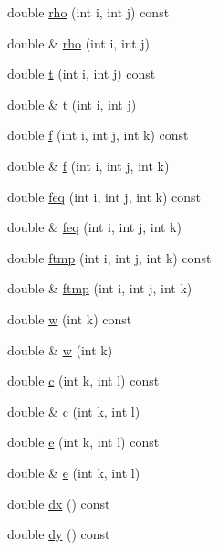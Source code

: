 \begin{DoxyCompactItemize}
double \mbox{\hyperlink{classStaggeredGrid_a5a5893e93d39443f13e13d05c139a8fc}{rho}} (int i, int j) const
\item 
double \& \mbox{\hyperlink{classStaggeredGrid_a73fd2714e8ce9af369c2dc3b3301369c}{rho}} (int i, int j)
\item 
double \mbox{\hyperlink{classStaggeredGrid_a477e8942e756cc2baecd1aaa5795bb3d}{t}} (int i, int j) const
\item 
double \& \mbox{\hyperlink{classStaggeredGrid_a30c69c5b8e2803a1e4d876f3942cecb1}{t}} (int i, int j)
\item 
double \mbox{\hyperlink{classStaggeredGrid_a2a9f3c3dc78482fc452920b5bbb2792e}{f}} (int i, int j, int k) const
\item 
double \& \mbox{\hyperlink{classStaggeredGrid_ad4ac0ad1aa8623609c4843c2ae10c37c}{f}} (int i, int j, int k)
\item 
double \mbox{\hyperlink{classStaggeredGrid_ac2473c046774f2e69a876187b574880a}{feq}} (int i, int j, int k) const
\item 
double \& \mbox{\hyperlink{classStaggeredGrid_ac0e3f62488a6dff7ce73d75f589c71cd}{feq}} (int i, int j, int k)
\item 
double \mbox{\hyperlink{classStaggeredGrid_a04771274659141abf54e2ea1946a5a34}{ftmp}} (int i, int j, int k) const
\item 
double \& \mbox{\hyperlink{classStaggeredGrid_af34086dde8f882682b1be25bbf785b26}{ftmp}} (int i, int j, int k)
\item 
double \mbox{\hyperlink{classStaggeredGrid_aa47f5ae98fed436b57457d8ff40fc74b}{w}} (int k) const
\item 
double \& \mbox{\hyperlink{classStaggeredGrid_a4a44f2af5f65826b69d499383938ad53}{w}} (int k)
\item 
double \mbox{\hyperlink{classStaggeredGrid_af1e5cee09668b3d2c693989f42ca3c8d}{c}} (int k, int l) const
\item 
double \& \mbox{\hyperlink{classStaggeredGrid_a73f563888c48febcbe71bcaaed297b49}{c}} (int k, int l)
\item 
double \mbox{\hyperlink{classStaggeredGrid_ab897f162fde80ab6163a2ba6782ac1fa}{e}} (int k, int l) const
\item 
double \& \mbox{\hyperlink{classStaggeredGrid_aae397f47eb73d9e4a92303ed3eb02bb2}{e}} (int k, int l)
\item 
double \mbox{\hyperlink{classStaggeredGrid_aec8490affea703cdd73b1febaed68968}{dx}} () const
\item 
double \mbox{\hyperlink{classStaggeredGrid_abde2da10e0c130fb0f206de64c9b4956}{dy}} () const

\end{DoxyCompactItemize}
